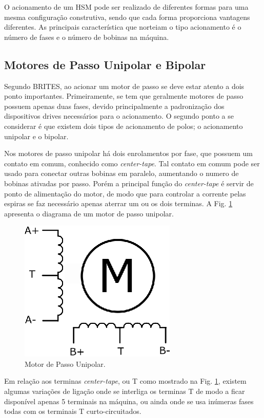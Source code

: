 O acionamento de um HSM pode ser realizado de diferentes formas para uma mesma configuração construtiva, sendo que cada forma proporciona vantagens diferentes. As principais característica que norteiam o tipo acionamento  é o número de  fases e o número de bobinas na máquina.

\subsection{Motores de Passo Unipolar e Bipolar}

Segundo BRITES\cite{PETele}, ao acionar um motor de passo se deve estar atento a dois ponto importantes. Primeiramente, se tem que geralmente motores de passo possuem apenas duas fases, devido principalmente a padronização dos dispositivos drives necessários para o acionamento. O segundo ponto a se considerar é que existem dois tipos de acionamento de polos; o acionamento unipolar e o bipolar.  

Nos motores de passo unipolar há dois enrolamentos por fase, que possuem um contato em comum, conhecido como \emph{center-tape}. Tal contato em comum pode ser usado para conectar outras bobinas em paralelo, aumentando o numero de bobinas ativadas por passo. Porém a principal função do \emph{center-tape} é servir de ponto de alimentação do motor, de modo que para controlar a corrente pelas espiras se faz necessário apenas aterrar um ou os dois terminas. A Fig. \ref{fig:MotorDePassoUnipolar} apresenta o diagrama de um motor de passo unipolar. 

\begin{figure}[H]
	\centering
	\includegraphics[width = 0.3 \columnwidth]{images/MotorDePassoUnipolar.eps}
	\caption{Motor de Passo Unipolar.}
	\label{fig:MotorDePassoUnipolar}
\end{figure} 

Em relação aos terminas \emph{center-tape}, ou T como mostrado na Fig. \ref{fig:MotorDePassoUnipolar}, existem algumas variações de ligação onde se interliga os terminas T de modo a ficar disponível apenas 5 terminais na máquina, ou ainda onde se usa inúmeras fases todas com os terminais T curto-circuitados.   

